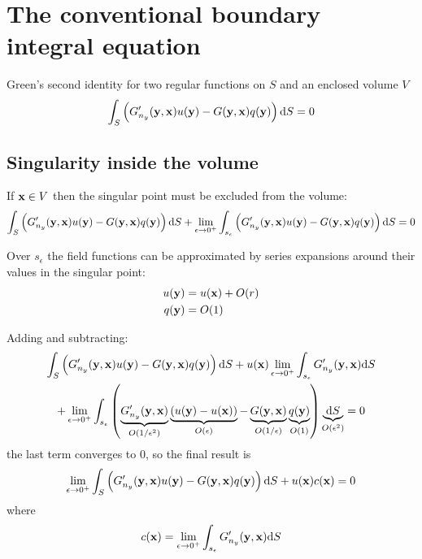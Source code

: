 \documentclass[a4paper,11pt]{article}
\newcommand{\td}{\mathrm{d}}
\begin{document}
\section{The conventional boundary integral equation}

Green's second identity for two regular functions on $S$ and an enclosed volume $V$
%
\begin{equation}
\int_{S}
\left(
G'_{n_y}({\bf y}, {\bf x}) u({\bf y}) - G({\bf y}, {\bf x}) q({\bf y})
\right)
\td S = 0
\end{equation}

\subsection{Singularity inside the volume}

If ${\bf x} \in V$ then the singular point must be excluded from the volume:
%
\begin{equation}
\int_{S}
\left(
G'_{n_y}({\bf y}, {\bf x}) u({\bf y}) - G({\bf y}, {\bf x}) q({\bf y})
\right)
\td S
+
\lim_{\epsilon \to 0^+}
\int_{s_{\epsilon}}
\left(
G'_{n_y}({\bf y}, {\bf x}) u({\bf y}) - G({\bf y}, {\bf x}) q({\bf y})
\right)
\td S = 0
\end{equation}

Over $s_{\epsilon}$ the field functions can be approximated by series expansions around their values in the singular point:
%
\begin{align}
u({\bf y}) &= u({\bf x}) + O(r) \nonumber \\
q({\bf y}) &= O(1)
\end{align}

Adding and subtracting:
\begin{multline}
\int_{S}
\left(
G'_{n_y}({\bf y}, {\bf x}) u({\bf y}) - G({\bf y}, {\bf x}) q({\bf y})
\right)
\td S
+
u({\bf x})
\lim_{\epsilon \to 0^+}
\int_{s_{\epsilon}}
G'_{n_y}({\bf y}, {\bf x}) 
\td S
\\
+
\lim_{\epsilon \to 0^+}
\int_{s_{\epsilon}}
\left(
\underbrace{G'_{n_y}({\bf y}, {\bf x})}_{O(1/\epsilon^2)} \underbrace{\left(u({\bf y}) - u({\bf x})\right)}_{O(\epsilon)}
- \underbrace{G({\bf y}, {\bf x})}_{O(1/\epsilon)} \underbrace{q({\bf y})}_{O(1)}
\right)
\underbrace{\td S}_{O(\epsilon^2)}
= 0
\end{multline}
%
the last term converges to 0, so the final result is
%
\begin{equation}
\lim_{\epsilon \to 0^+}
\int_{S}
\left(
G'_{n_y}({\bf y}, {\bf x}) u({\bf y}) - G({\bf y}, {\bf x}) q({\bf y})
\right)
\td S
+
u({\bf x})
c({\bf x})
= 0
\end{equation}
%
where
%
\begin{equation}
c({\bf x})
=
\lim_{\epsilon \to 0^+}
\int_{s_{\epsilon}}
G'_{n_y}({\bf y}, {\bf x}) 
\td S
\end{equation}
\end{document}
